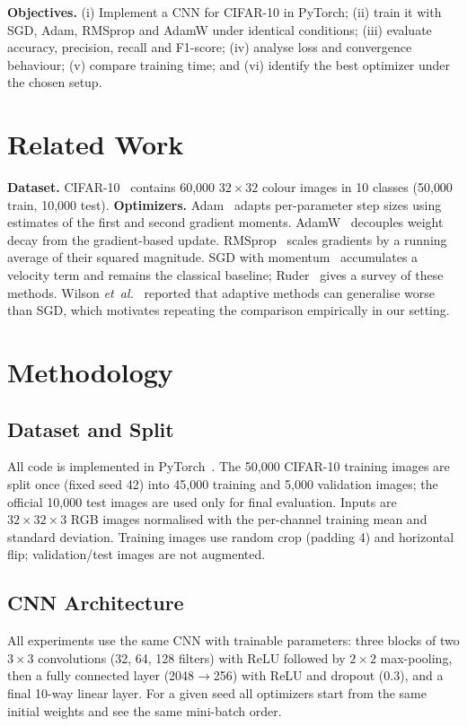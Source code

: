\documentclass[conference]{IEEEtran}
\begin{document}
\textbf{Objectives.} (i) Implement a CNN for CIFAR-10 in PyTorch; (ii) train it with SGD, Adam, RMSprop and AdamW under identical conditions; (iii) evaluate accuracy, precision, recall and F1-score; (iv) analyse loss and convergence behaviour; (v) compare training time; and (vi) identify the best optimizer under the chosen setup.

\section{Related Work}
\textbf{Dataset.} CIFAR-10~\cite{krizhevsky2009} contains 60{,}000 $32\times32$ colour images in 10 classes (50{,}000 train, 10{,}000 test).
\textbf{Optimizers.} Adam~\cite{kingma2015} adapts per-parameter step sizes using estimates of the first and second gradient moments. AdamW~\cite{loshchilov2019} decouples weight decay from the gradient-based update. RMSprop~\cite{tieleman2012} scales gradients by a running average of their squared magnitude. SGD with momentum~\cite{sutskever2013} accumulates a velocity term and remains the classical baseline; Ruder~\cite{ruder2016} gives a survey of these methods. Wilson \emph{et~al.}~\cite{wilson2017} reported that adaptive methods can generalise worse than SGD, which motivates repeating the comparison empirically in our setting.

\section{Methodology}
\subsection{Dataset and Split}
All code is implemented in PyTorch~\cite{paszke2019}. The 50{,}000 CIFAR-10 training images are split once (fixed seed 42) into 45{,}000 training and 5{,}000 validation images; the official 10{,}000 test images are used only for final evaluation. Inputs are $32\times32\times3$ RGB images normalised with the per-channel training mean and standard deviation. Training images use random crop (padding 4) and horizontal flip; validation/test images are not augmented.

\subsection{CNN Architecture}
All experiments use the same CNN with \nParams{} trainable parameters: three blocks of two $3\times3$ convolutions (32, 64, 128 filters) with ReLU followed by $2\times2$ max-pooling, then a fully connected layer (2048$\to$256) with ReLU and dropout (0.3), and a final 10-way linear layer. For a given seed all optimizers start from the same initial weights and see the same mini-batch order.
\end{document}
